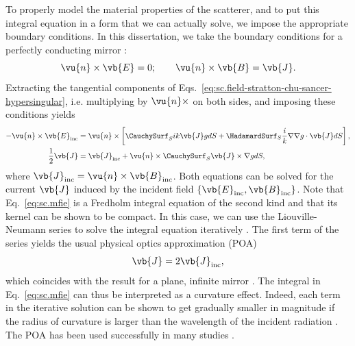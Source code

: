 \documentclass[11pt,SymmetricalJury]{inrsthesis/inrsthesis}
\begin{document}
To properly model the material properties of the scatterer, and to put this
integral equation in a form that we can actually solve, we impose the
appropriate boundary conditions. In this dissertation, we take the boundary conditions
for a perfectly conducting mirror \cite[Eq. (1.18)]{Stratton1941}:
  \begin{equation}
    \label{eq:sc.boundaryConditions}
    \vu{n}\times\vb{E}=0;\qquad \vu{n}\times\vb{B}=\vb{J}.
  \end{equation}
Extracting the tangential components of Eqs.~\eqref{eq:sc.field-stratton-chu-sancer-hypersingular},
i.e. multiplying by $\vu{n}\times$ on both sides,
and imposing these conditions yields
  \begin{subequations}
  \begin{align}
    -\vu{n}\times\vb{E}_\text{inc} &= \vu{n}\times\left[\CauchySurf_S ik\vb{J}g dS + \HadamardSurf_S\frac{i}{k}\nabla\nabla g\cdot\vb{J} dS\right],\\
    \label{eq:sc.mfie}
    \frac{1}{2}\vb{J}  &= \vb{J}_\text{inc} + \vu{n}\times\CauchySurf_S \vb{J}\times\nabla gdS,
  \end{align}
  \end{subequations}
where $\vb{J}_\text{inc}=\vu{n}\times\vb{B}_\text{inc}$.
Both equations can be solved for the current $\vb{J}$ induced by the incident
field $\{\vb{E}_\text{inc},\vb{B}_\text{inc}\}$. Note that Eq.~\eqref{eq:sc.mfie}
is a Fredholm integral equation of the second kind and that its kernel can be
shown to be compact. In this case, we can use the Liouville-Neumann series to
solve the integral equation iteratively \cite[\S6.16]{Jones1994}. The first term
of the series yields the usual physical optics approximation (POA)
  \begin{equation}
    \label{eq:sc.poa}
    \vb{J} = 2\vb{J}_\text{inc},
  \end{equation}
which coincides with the result for a plane, infinite mirror \cite[\S12.2]{Bladel2007}. The
integral in Eq.~\eqref{eq:sc.mfie} can thus be interpreted as a curvature effect.
Indeed, each term in the iterative solution can be shown to get gradually smaller
in magnitude if the radius of curvature is larger than the wavelength of the
incident radiation \cite{Cullen1958,Bladel2007}.
The POA has been used successfully in many studies \cite{Bouwkamp1954,Love1978}.
\end{document}
